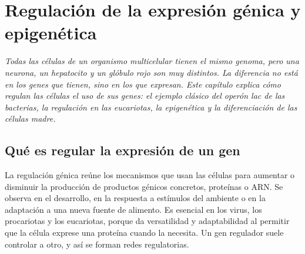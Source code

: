 \documentclass{book}
\begin{document}
\chapter{Regulación de la expresión génica y epigenética}
\label{chap:bio-08}

\noindent\textit{Todas las células de un organismo multicelular tienen el mismo genoma, pero una neurona, un hepatocito y un glóbulo rojo son muy distintos. La diferencia no está en los genes que tienen, sino en los que expresan. Este capítulo explica cómo regulan las células el uso de sus genes: el ejemplo clásico del operón lac de las bacterias, la regulación en las eucariotas, la epigenética y la diferenciación de las células madre.}


\section{Qué es regular la expresión de un gen}

La regulación génica reúne los mecanismos que usan las células para aumentar o disminuir la producción de productos génicos concretos, proteínas o ARN. Se observa en el desarrollo, en la respuesta a estímulos del ambiente o en la adaptación a una nueva fuente de alimento. Es esencial en los virus, los procariotas y los eucariotas, porque da versatilidad y adaptabilidad al permitir que la célula exprese una proteína cuando la necesita. Un gen regulador suele controlar a otro, y así se forman redes regulatorias.

\end{document}
